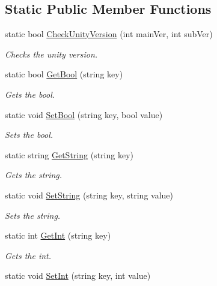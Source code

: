 \subsection*{Static Public Member Functions}
\begin{DoxyCompactItemize}
\item 
static bool \hyperlink{class_lerp2_a_p_i_1_1_lerped_core_ab24f1c6e4a14adc472022a48a21d81d4}{Check\+Unity\+Version} (int main\+Ver, int sub\+Ver)
\begin{DoxyCompactList}\small\item\em Checks the unity version. \end{DoxyCompactList}\item 
static bool \hyperlink{class_lerp2_a_p_i_1_1_lerped_core_a561a69b0d322804e7d08899b584188df}{Get\+Bool} (string key)
\begin{DoxyCompactList}\small\item\em Gets the bool. \end{DoxyCompactList}\item 
static void \hyperlink{class_lerp2_a_p_i_1_1_lerped_core_a48b631ddb59cbfbe36158a72037e674b}{Set\+Bool} (string key, bool value)
\begin{DoxyCompactList}\small\item\em Sets the bool. \end{DoxyCompactList}\item 
static string \hyperlink{class_lerp2_a_p_i_1_1_lerped_core_ab15116e8a0a077a93db066e24d737d9d}{Get\+String} (string key)
\begin{DoxyCompactList}\small\item\em Gets the string. \end{DoxyCompactList}\item 
static void \hyperlink{class_lerp2_a_p_i_1_1_lerped_core_a37695960379368ba971962941ced7c0b}{Set\+String} (string key, string value)
\begin{DoxyCompactList}\small\item\em Sets the string. \end{DoxyCompactList}\item 
static int \hyperlink{class_lerp2_a_p_i_1_1_lerped_core_ac6a20617421e0b788afb91f189986d57}{Get\+Int} (string key)
\begin{DoxyCompactList}\small\item\em Gets the int. \end{DoxyCompactList}\item 
static void \hyperlink{class_lerp2_a_p_i_1_1_lerped_core_a604b706b940c895a0b6598cc98bdcc0f}{Set\+Int} (string key, int value)

\end{DoxyCompactItemize}
